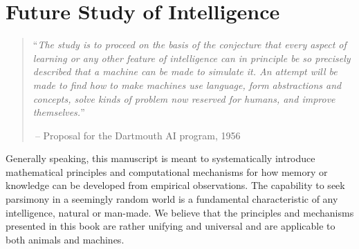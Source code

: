 \documentclass[../../book-main.tex]{subfiles}
\begin{document}
\chapter{Future Study of Intelligence}
\label{ch:future}


  

\begin{quote}
``{\em The study is to proceed on the basis of the conjecture that every aspect of learning or any other feature of intelligence can in principle be so precisely described that a machine can be made to simulate it. An attempt will be made to find how to make machines use language, form abstractions and concepts, solve kinds of problem now reserved for humans, and improve themselves.}''

$~$\hfill -- Proposal for the Dartmouth AI program, 1956
 \end{quote}
\vspace{5mm}


Generally speaking, this manuscript is meant to systematically introduce mathematical principles and computational mechanisms for how memory or knowledge can be developed from empirical observations. The capability to seek parsimony in a seemingly random world is a fundamental characteristic of any intelligence, natural or man-made. We believe that the principles and mechanisms presented in this book are rather unifying and universal and are applicable to both animals and machines. 
\end{document}
